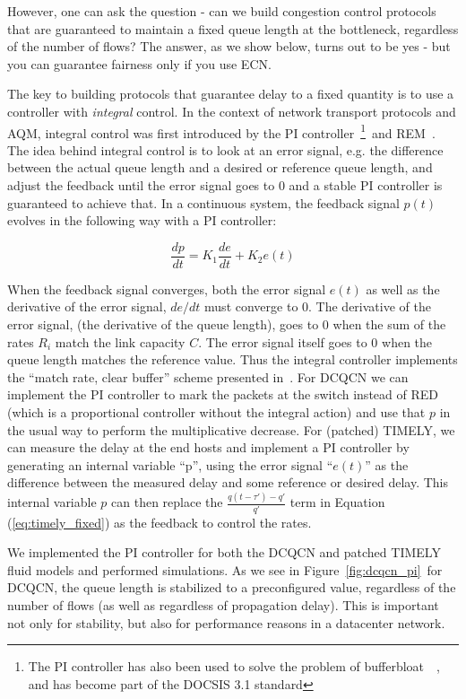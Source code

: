 However, one can ask the question - can we build congestion control protocols
that are guaranteed to maintain a fixed queue length at the bottleneck,
regardless of the number of flows? The answer, as we show below, turns out to be
yes - but you can guarantee fairness only if you use ECN.

The key to building protocols that guarantee delay to a fixed quantity
is to use a controller with \emph{integral} control. In the context of
network transport protocols and AQM, integral control was first introduced
by the PI controller~\cite{hollot2001designing}\footnote{ 
The PI controller has also been used to solve the problem of bufferbloat~\cite{conf/hpsr/PanNPPSBV13,bufferbloat-pi}~, and
has become part of the DOCSIS 3.1 standard}~and
REM~\cite{REM}.
The idea behind integral control is to look at an
error signal, e.g. the difference between the actual queue length and
a desired or reference queue length, and adjust the feedback until the
error signal goes to 0 and a stable PI controller is guaranteed to
achieve that. In a continuous system, the feedback signal $p(t)$
evolves in the following way with a PI controller:

$$ \frac{dp}{dt} = K_1\frac{de}{dt}+K_2e(t) $$

When the feedback signal converges, both the error signal $e(t)$ as
well as the derivative of the error signal, $de/dt$ must converge to
0. The derivative of the error signal, (the derivative of the queue length), goes to 0
when the sum of the rates $R_i$ match the link capacity $C$. The error signal itself goes to 0
when the queue length matches the reference value. Thus the integral
controller implements the ``match rate, clear buffer'' scheme
presented in~\cite{REM}. For DCQCN we can implement the PI
controller to mark the packets at the switch instead of RED (which is
a proportional controller without the integral action) and use that
$p$ in the usual way to perform the multiplicative decrease. For
(patched) TIMELY, we can
measure the delay at the end hosts and implement a PI controller by
generating an internal variable ``p'', using the error signal
``$e(t)$'' as the difference between the measured delay and some
reference or desired delay. This internal variable $p$ can then
replace the $\tfrac{{q(t - \tau ') - q'}}{{q'}}$ term in
Equation (\ref{eq:timely_fixed}) as the feedback to control the rates.

We implemented the PI controller for both the DCQCN and patched TIMELY
fluid models and performed simulations. As we see in
Figure~\ref{fig:dcqcn_pi}~for DCQCN, the queue length is stabilized to a
preconfigured value, regardless of the number of flows (as well as
regardless of propagation delay). This is important not only for
stability, but also for performance reasons in a datacenter network.

